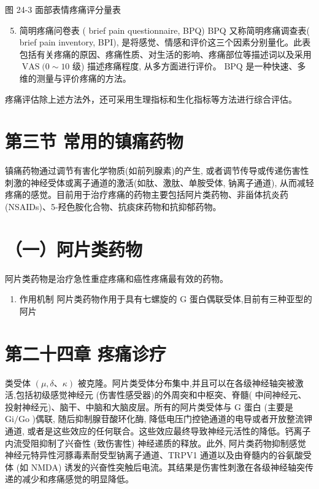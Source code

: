 \documentclass[10pt]{article}
\begin{document}
图 24-3 面部表情疼痛评分量表

\begin{enumerate}
  \setcounter{enumi}{4}
  \item 简明疼痛问卷表 ( brief pain questionnaire, BPQ) BPQ 又称简明疼痛调查表( brief pain inventory, BPI), 是将感觉、情感和评价这三个因素分别量化。此表包括有关疼痛的原因、疼痛性质、对生活的影响、疼痛部位等描述词以及采用 $\operatorname{VAS}(0 \sim 10$ 级) 描述疼痛程度, 从多方面进行评价。 $\mathrm{BPQ}$ 是一种快速、多维的测量与评价疼痛的方法。
\end{enumerate}

疼痛评估除上述方法外，还可采用生理指标和生化指标等方法进行综合评估。

\section*{第三节 常用的镇痛药物}
镇痛药物通过调节有害化学物质(如前列腺素)的产生, 或者调节传导或传递伤害性刺激的神经受体或离子通道的激活(如肽、激肽、单胺受体, 钠离子通道), 从而减轻疼痛的感觉。目前用于治疗疼痛的药物主要包括阿片类药物、非甾体抗炎药(NSAIDs)、5-羟色胺化合物、抗痰㾁药物和抗抑郁药物。

\section*{（一）阿片类药物}
阿片类药物是治疗急性重症疼痛和癌性疼痛最有效的药物。

\begin{enumerate}
  \item 作用机制 阿片类药物作用于具有七螺旋的 $\mathrm{G}$ 蛋白偶联受体,目前有三种亚型的阿片
\end{enumerate}

\section*{第二十四章 疼痛诊疗}
类受体 $(\mu, \delta 、 \kappa)$ 被克隆。阿片类受体分布集中,并且可以在各级神经轴突被激活,包括初级感觉神经元 (伤害性感受器)的外周突和中枢突、脊髓( 中间神经元、投射神经元)、脑干、中脑和大脑皮层。所有的阿片类受体与 $\mathrm{G}$ 蛋白 (主要是 $\mathrm{Gi} / \mathrm{Go}$ )偶联, 随后抑制腺苷酸环化酶, 降低电压门控铯通道的电导或者开放整流钾通道, 或者是这些效应的任何联合。这些效应最终导致神经元活性的降低。钙离子内流受阻抑制了兴奋性 (致伤害性) 神经递质的释放。此外, 阿片类药物抑制感觉神经元特异性河豚毒素耐受型钠离子通道、TRPV1 通道以及由脊髓内的谷氨酸受体 (如 NMDA) 诱发的兴奋性突触后电流。其结果是伤害性刺激在各级神经轴突传递的减少和疼痛感觉的明显降低。
\end{document}
